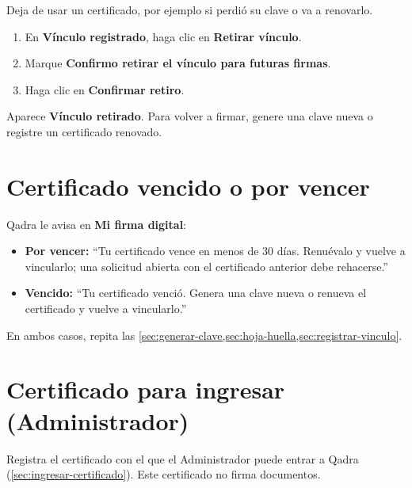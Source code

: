 \paraque Deja de usar un certificado, por ejemplo si perdió su clave o va a
renovarlo.


\pasos
\begin{enumerate}
  \item En \textbf{Vínculo registrado}, haga clic en \textbf{Retirar vínculo}.
  \item Marque \textbf{Confirmo retirar el vínculo para futuras firmas}.
  \item Haga clic en \textbf{Confirmar retiro}.
\end{enumerate}

\resultado Aparece \textbf{Vínculo retirado}. Para volver a firmar, genere
una clave nueva o registre un certificado renovado.

\section{Certificado vencido o por vencer}\label{sec:certificado-vence}

Qadra le avisa en \textbf{Mi firma digital}:

\begin{itemize}
  \item \textbf{Por vencer:} \enquote{Tu certificado vence en menos de 30
        días. Renuévalo y vuelve a vincularlo; una solicitud abierta con el
        certificado anterior debe rehacerse.}
  \item \textbf{Vencido:} \enquote{Tu certificado venció. Genera una clave
        nueva o renueva el certificado y vuelve a vincularlo.}
\end{itemize}

En ambos casos, repita las \cref{sec:generar-clave,sec:hoja-huella,sec:registrar-vinculo}.

\section{Certificado para ingresar (Administrador)}\label{sec:acceso-certificado}

\paraque Registra el certificado con el que el Administrador puede entrar a
Qadra (\cref{sec:ingresar-certificado}). Este certificado no firma
documentos.

